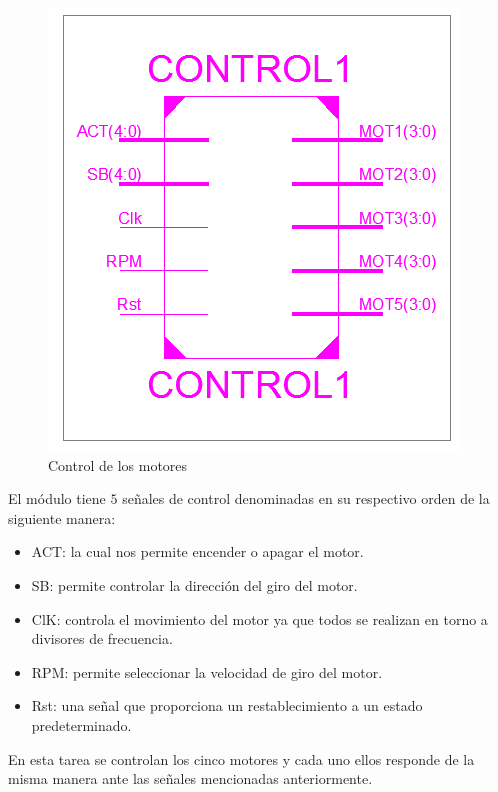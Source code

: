 \documentclass[twocolumn]{IEEEtran}
\begin{document}
\begin{figure}[H]
	\centering
		\includegraphics[scale=0.4]{control.png}
	\caption{Control de los motores}
	\label{fig4}
\end{figure}
\noindent
El módulo  tiene $5$ señales de control denominadas en su respectivo orden de la siguiente manera:
\begin{itemize}
 \item ACT: la cual nos permite encender o apagar el motor.
 \item SB: permite controlar la dirección del giro del motor.
 \item ClK: controla el movimiento del motor ya que todos se realizan en torno a divisores de frecuencia.
 \item RPM: permite seleccionar la velocidad de giro del motor.
 \item Rst: una señal que proporciona un restablecimiento a un estado predeterminado.
 \end{itemize}
\noindent
En esta tarea se controlan los cinco motores y cada uno ellos responde de la misma manera ante las señales mencionadas anteriormente.
\end{document}
